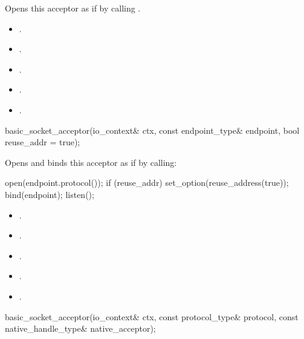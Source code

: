 \begin{itemdescr}
\pnum
\effects Opens this acceptor as if by calling .

\pnum
\postconditions 
\begin{itemize}
\item
{}.
\item
{}.
\item
{}.
\item
{}.
\item
{}.
\end{itemize}
\end{itemdescr}

\begin{itemdecl}
basic_socket_acceptor(io_context& ctx, const endpoint_type& endpoint,
                      bool reuse_addr = true);
\end{itemdecl}

\begin{itemdescr}
\pnum
\effects Opens and binds this acceptor as if by calling: 
\begin{codeblock}
open(endpoint.protocol());
if (reuse_addr)
  set_option(reuse_address(true));
bind(endpoint);
listen();
\end{codeblock}


\pnum
\postconditions 
\begin{itemize}
\item
{}.
\item
{}.
\item
{}.
\item
{}.
\item
{}.
\end{itemize}
\end{itemdescr}

\begin{itemdecl}
basic_socket_acceptor(io_context& ctx, const protocol_type& protocol,
                      const native_handle_type& native_acceptor);
\end{itemdecl}

